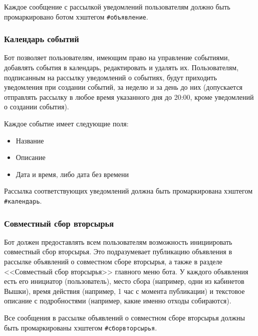     Каждое сообщение с рассылкой уведомлений пользователям должно быть промаркировано ботом хэштегом
    \hbox{\texttt{\#объявление}}.

\subsubsection{Календарь событий}
    \label{sec:req:fn:calendar}
    Бот позволяет пользователям, имеющим право на управление событиями, добавлять события в календарь,
    редактировать и удалять их. Пользователям, подписанным на рассылку уведомлений о событиях,
    будут приходить уведомления при создании событий, за неделю и за день до них (допускается отправлять
    рассылку в любое время указанного дня до 20:00, кроме уведомлений о создании события).

    Каждое событие имеет следующие поля:
    \begin{itemize}
        \item
            Название
        \item
            Описание
        \item
            Дата и время, либо дата без времени
    \end{itemize}

    Рассылка соответствующих уведомлений должна быть промаркирована хэштегом \hbox{\texttt{\#календарь}}.

\subsubsection{Совместный сбор вторсырья}
    Бот должен предоставлять всем пользователям возможность инициировать совместный сбор вторсырья.
    Это подразумевает публикацию объявления в рассылке объявлений о совместном сборе вторсырья,
    а также в разделе <<Совместный сбор вторсырья>> главного меню бота. У каждого объявления есть
    его инициатор (пользователь), место сбора (например, одни из кабинетов Вышки), время действия
    (например, 1 час с момента публикации) и текстовое описание с подробностями (например, какие
    именно отходы собираются).

    Все сообщения в рассылке объявлений о совместном сборе вторсырья должны быть промаркированы
    хэштегом \hbox{\texttt{\#сборвторсырья}}.

